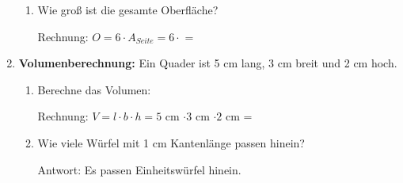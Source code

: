 \begin{enumerate}[resume, label=\arabic*.]
\begin{enumerate}[label=\alph*)]
        \item Wie groß ist die gesamte Oberfläche? 

        Rechnung: $O = 6 \cdot A_{Seite} = 6 \cdot$ \underline{\hspace{2cm}} = \underline{\hspace{3cm}}
    \end{enumerate}

    \vspace{0.5cm}

    \item \textbf{Volumenberechnung:} Ein Quader ist 5 cm lang, 3 cm breit und 2 cm hoch.

    \begin{enumerate}[label=\alph*)]
        \item Berechne das Volumen:

        Rechnung: $V = l \cdot b \cdot h = 5$ cm $\cdot 3$ cm $\cdot 2$ cm = \underline{\hspace{4cm}}

        \item Wie viele Würfel mit 1 cm Kantenlänge passen hinein? 

        Antwort: Es passen \underline{\hspace{3cm}} Einheitswürfel hinein.
    \end{enumerate}
\end{enumerate}
